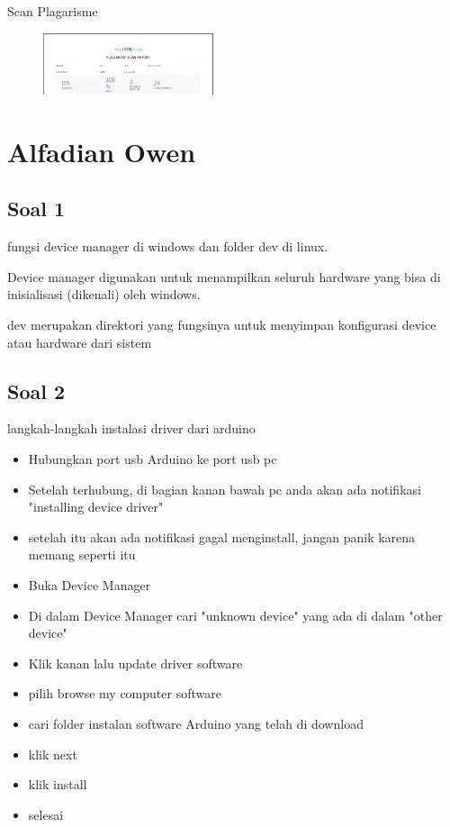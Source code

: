 \begin{enumerate}
\par Scan Plagarisme
\begin{figure}[!h]	
    \includegraphics[width=5cm]{figures/5/1174077/teori/plagarismechap5.png}
    \centering
\end{figure}
\end{enumerate}
\section{Alfadian Owen}
\subsection{Soal 1}
 fungsi device manager di windows dan folder dev di linux.

Device manager digunakan untuk menampilkan seluruh hardware yang bisa di inisialisasi (dikenali) oleh windows.

dev merupakan direktori yang fungsinya untuk menyimpan konfigurasi device atau hardware dari sistem

\subsection{Soal 2}
langkah-langkah instalasi driver dari arduino

\begin{itemize}
	\item Hubungkan port usb Arduino ke port usb pc
	\item Setelah terhubung, di bagian kanan bawah pc anda akan ada notifikasi "installing device driver"
	\item setelah itu akan ada notifikasi gagal menginstall, jangan panik karena memang seperti itu
	\item Buka Device Manager
	\item Di dalam Device Manager cari "unknown device" yang ada di dalam "other device"
	\item Klik kanan lalu update driver software
	\item pilih browse my computer software
	\item cari folder instalan software Arduino yang telah di download
	\item klik next
	\item klik install
	\item selesai
\end{itemize}

